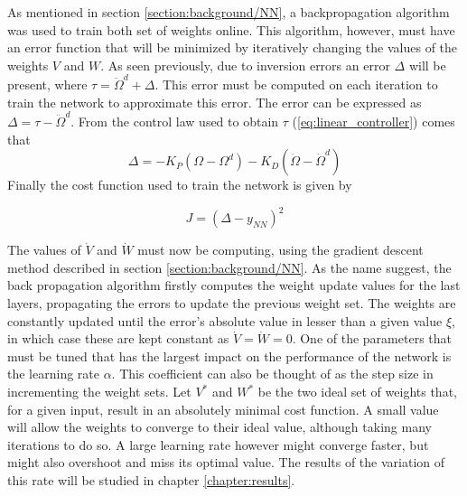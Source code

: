 As mentioned in section \ref{section:background/NN}, a backpropagation algorithm was used to train both set of weights online. This algorithm, however, must have an error function that will be minimized by iteratively changing the values of the weights $V$ and $W$. As seen previously, due to inversion errors an error $\Delta$ will be present, where $\tau = \ddot{\Omega}^d + \Delta$. This error must be computed on each iteration to train the network to approximate this error. The error can be expressed as $\Delta=\tau - \ddot{\Omega}^d$. From the control law used to obtain $\tau$ (\ref{eq:linear_controller}) comes that
\begin{equation}
\Delta = -K_P(\Omega-\Omega^d)-K_D(\dot{\Omega}-\dot{\Omega}^d)
\label{eq:inversion_error}
\end{equation}
Finally the cost function used to train the network is given by

\begin{equation}
J=(\Delta-y_{NN})^2
\label{eq:NN_cost}
\end{equation}

The values of $\dot{V}$ and $\dot{W}$ must now be computing, using the gradient descent method described in section \ref{section:background/NN}. As the name suggest, the back propagation algorithm firstly computes the weight update values for the last layers, propagating the errors to update the previous weight set. The weights are constantly updated until the error's absolute value in lesser than a given value $\xi$, in which case these are kept constant as $\dot{V}=\dot{W}=0$. 
One of the parameters that must be tuned that has the largest impact on the performance of the network is the learning rate $\alpha$. This coefficient can also be thought of as the step size in incrementing the weight sets. Let $V^*$ and $W^*$ be the two ideal set of weights that, for a given input, result in an absolutely minimal cost function. A small value will allow the weights to converge to their ideal value, although taking many iterations to do so. A large learning rate however might converge faster, but might also overshoot and miss its optimal value. The results of the variation of this rate will be studied in chapter \ref{chapter:results}.

